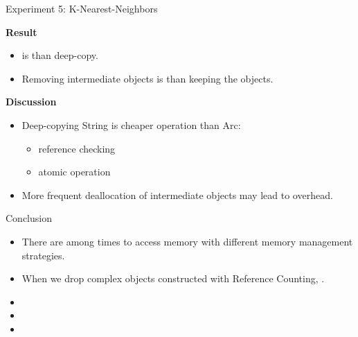 \documentclass[9pt]{beamer}
\begin{document}


\begin{frame}[fragile]{Experiment 5: K-Nearest-Neighbors}
    
    \textbf{Result}
    \begin{itemize}
        \item {} is  than deep-copy.
        \item Removing intermediate objects is  than keeping the objects.
    \end{itemize}

    \vspace{0.5cm}

    \textbf{Discussion}
    \begin{itemize}
        \item Deep-copying String is cheaper operation than Arc: 
        \begin{itemize}
            \item reference checking
            \item atomic operation
        \end{itemize}
        \item More frequent deallocation of intermediate objects may lead to overhead.
    \end{itemize} 
\end{frame}


\begin{frame}[fragile]{Conclusion}
    \begin{itemize}
        \item There are  among times to access memory with different memory management strategies.
        \item When we drop complex objects constructed with Reference Counting, . 
        \item {}
        \item {}
        \item {}
    \end{itemize}
\end{frame}
\end{document}
